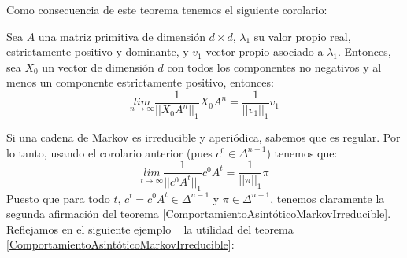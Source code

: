 Como consecuencia de este teorema tenemos el siguiente corolario:
\begin{corollary}
    Sea $A$ una matriz primitiva de dimensión $d\times d$, $\lambda_1$ su valor propio real, estrictamente positivo y dominante, y $v_1$ vector propio asociado a $\lambda_1$. Entonces, sea $X_0$ un vector de dimensión $d$ con todos los componentes no negativos y al menos un componente estrictamente positivo, entonces:
    \[\underset{n\rightarrow\infty}{lim}\frac{1}{||X_0A^n||_1}X_0A^n=\frac{1}{||v_1||_1}v_1\]
\end{corollary}
Si una cadena de Markov es irreducible y aperiódica, sabemos que es regular. Por lo tanto, usando el corolario anterior (pues $c^0\in\Delta^{n-1}$) tenemos que:
    \[\underset{t\rightarrow\infty}{lim}\frac{1}{||c^0A^t||_1}c^0A^t=\frac{1}{||\pi||_1}\pi\]
Puesto que para todo $t$, $c^t=c^0A^t\in\Delta^{n-1}$ y $\pi\in\Delta^{n-1}$, tenemos claramente la segunda afirmación del teorema \ref{ComportamientoAsintóticoMarkovIrreducible}. Reflejamos en el siguiente ejemplo ~\cite{Núñez} la utilidad del teorema \ref{ComportamientoAsintóticoMarkovIrreducible}: 

